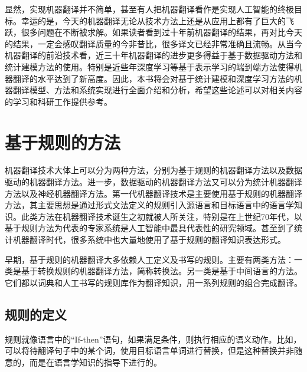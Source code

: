 \parinterval 显然，实现机器翻译并不简单，甚至有人把机器翻译看作是实现人工智能的终极目标。幸运的是，今天的机器翻译无论从技术方法上还是从应用上都有了巨大的飞跃，很多问题在不断被求解。如果读者看到过十年前机器翻译的结果，再对比今天的结果，一定会感叹翻译质量的今非昔比，很多译文已经非常准确且流畅。从当今机器翻译的前沿技术看，近三十年机器翻译的进步更多得益于基于数据驱动方法和统计建模方法的使用。特别是近些年深度学习等基于表示学习的端到端方法使得机器翻译的水平达到了新高度。因此，本书将会对基于统计建模和深度学习方法的机器翻译模型、方法和系统实现进行全面介绍和分析，希望这些论述可以对相关内容的学习和科研工作提供参考。


\sectionnewpage
\section{基于规则的方法}\label{section-1.4}
\parinterval 机器翻译技术大体上可以分为两种方法，分别为基于规则的机器翻译方法以及数据驱动的机器翻译方法。进一步，数据驱动的机器翻译方法又可以分为统计机器翻译方法以及神经机器翻译方法。第一代机器翻译技术是主要使用基于规则的机器翻译方法，其主要思想是通过形式文法定义的规则引入源语言和目标语言中的语言学知识。此类方法在机器翻译技术诞生之初就被人所关注，特别是在上世纪70年代，以基于规则方法为代表的专家系统是人工智能中最具代表性的研究领域。甚至到了统计机器翻译时代，很多系统中也大量地使用了基于规则的翻译知识表达形式。

\parinterval 早期，基于规则的机器翻译大多依赖人工定义及书写的规则。主要有两类方法：一类是基于转换规则的机器翻译方法，简称转换法。另一类是基于中间语言的方法。它们都以词典和人工书写的规则库作为翻译知识，用一系列规则的组合完成翻译。


\subsection{规则的定义}

\parinterval 规则就像语言中的“If-then”语句，如果满足条件，则执行相应的语义动作。比如，可以将待翻译句子中的某个词，使用目标语言单词进行替换，但是这种替换并非随意的，而是在语言学知识的指导下进行的。

